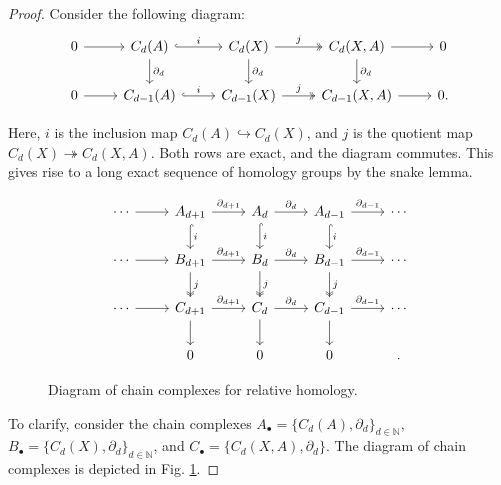 \begin{proof}
Consider the following diagram:
\begin{equation}
\begin{tikzcd}
0 \arrow[r] & C_d(A) \arrow[r, "i", hook] \arrow[d, "\partial_d"] & C_d(X) \arrow[r, "j", two heads] \arrow[d, "\partial_d"] & {C_d(X,A)} \arrow[r] \arrow[d, "\partial_d"] & 0 \\
0 \arrow[r] & C_{d-1}(A) \arrow[r, "i", hook]                               & C_{d-1}(X) \arrow[r, "j", two heads]                               & {C_{d-1}(X,A)} \arrow[r]                               & 0.
\end{tikzcd}
\end{equation}

Here, $i$ is the inclusion map $C_d(A) \hookrightarrow C_d(X)$, and $j$ is the quotient map $C_d(X) \twoheadrightarrow C_d(X,A)$. Both rows are exact, and the diagram commutes. This gives rise to a long exact sequence of homology groups by the snake lemma.

\begin{figure}
\begin{equation*}
\begin{tikzcd}
\cdots \arrow[r] & A_{d+1} \arrow[r, "\partial_{d+1}"] \arrow[d, "i", hook]      & A_d \arrow[r, "\partial_d"] \arrow[d, "i", hook]      & A_{d-1} \arrow[r, "\partial_{d-1}"] \arrow[d, "i", hook]      & \cdots \\
\cdots \arrow[r] & B_{d+1} \arrow[r, "\partial_{d+1}"] \arrow[d, "j", two heads] & B_d \arrow[r, "\partial_d"] \arrow[d, "j", two heads] & B_{d-1} \arrow[r, "\partial_{d-1}"] \arrow[d, "j", two heads] & \cdots \\
\cdots \arrow[r] & C_{d+1} \arrow[r, "\partial_{d+1}"] \arrow[d]                             & C_d \arrow[r, "\partial_d"] \arrow[d]                             & C_{d-1} \arrow[r, "\partial_{d-1}"] \arrow[d]                             & \cdots \\
                 & 0                                                                   & 0                                                               & 0                                                                   & .
\end{tikzcd}
\end{equation*}
\caption{Diagram of chain complexes for relative homology.}
\label{diagramchains}
\end{figure}

To clarify, consider the chain complexes $A_\bullet = \{C_d(A), \partial_d\}_{d\in\mathbb{N}}$, $B_\bullet = \{C_d(X), \partial_d\}_{d\in\mathbb{N}}$, and $C_\bullet = \{C_d(X,A), \partial_d\}$. The diagram of chain complexes is depicted in Fig. \ref{diagramchains}.


\end{proof}
